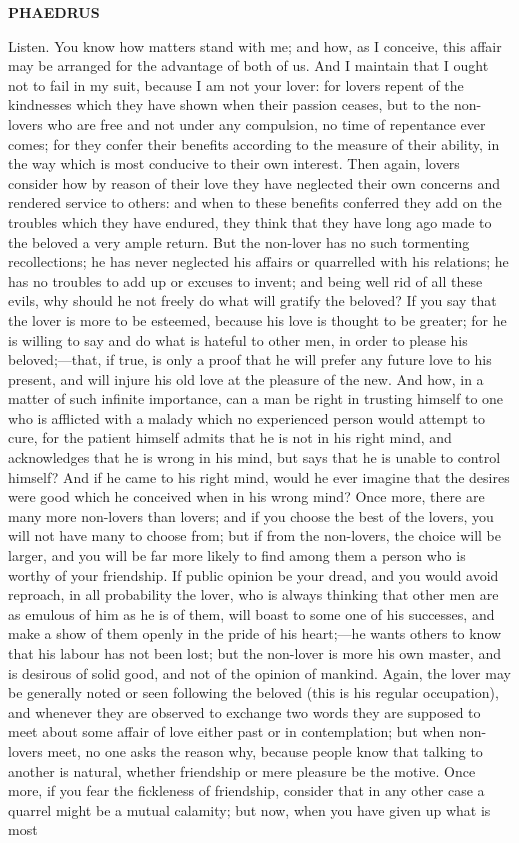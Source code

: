 \documentclass[11pt,letter]{article}
\begin{document}
\par \textbf{PHAEDRUS}
\par   Listen. You know how matters stand with me; and how, as I conceive, this affair may be arranged for the advantage of both of us. And I maintain that I ought not to fail in my suit, because I am not your lover:  for lovers repent of the kindnesses which they have shown when their passion ceases, but to the non-lovers who are free and not under any compulsion, no time of repentance ever comes; for they confer their benefits according to the measure of their ability, in the way which is most conducive to their own interest. Then again, lovers consider how by reason of their love they have neglected their own concerns and rendered service to others:  and when to these benefits conferred they add on the troubles which they have endured, they think that they have long ago made to the beloved a very ample return. But the non-lover has no such tormenting recollections; he has never neglected his affairs or quarrelled with his relations; he has no troubles to add up or excuses to invent; and being well rid of all these evils, why should he not freely do what will gratify the beloved? If you say that the lover is more to be esteemed, because his love is thought to be greater; for he is willing to say and do what is hateful to other men, in order to please his beloved;—that, if true, is only a proof that he will prefer any future love to his present, and will injure his old love at the pleasure of the new. And how, in a matter of such infinite importance, can a man be right in trusting himself to one who is afflicted with a malady which no experienced person would attempt to cure, for the patient himself admits that he is not in his right mind, and acknowledges that he is wrong in his mind, but says that he is unable to control himself? And if he came to his right mind, would he ever imagine that the desires were good which he conceived when in his wrong mind? Once more, there are many more non-lovers than lovers; and if you choose the best of the lovers, you will not have many to choose from; but if from the non-lovers, the choice will be larger, and you will be far more likely to find among them a person who is worthy of your friendship. If public opinion be your dread, and you would avoid reproach, in all probability the lover, who is always thinking that other men are as emulous of him as he is of them, will boast to some one of his successes, and make a show of them openly in the pride of his heart;—he wants others to know that his labour has not been lost; but the non-lover is more his own master, and is desirous of solid good, and not of the opinion of mankind. Again, the lover may be generally noted or seen following the beloved (this is his regular occupation), and whenever they are observed to exchange two words they are supposed to meet about some affair of love either past or in contemplation; but when non-lovers meet, no one asks the reason why, because people know that talking to another is natural, whether friendship or mere pleasure be the motive. Once more, if you fear the fickleness of friendship, consider that in any other case a quarrel might be a mutual calamity; but now, when you have given up what is most 
\end{document}
